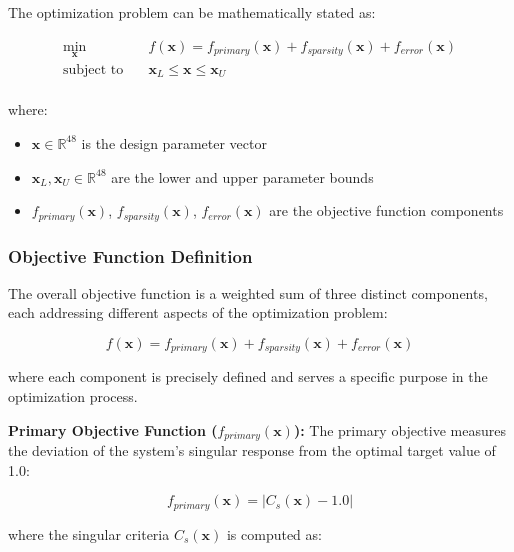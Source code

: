 \documentclass[12pt,a4paper]{article}
\begin{document}
The optimization problem can be mathematically stated as:

\begin{equation}\label{Eq.optimization_problem}
\begin{aligned}
\min_{\mathbf{x}} \quad & f(\mathbf{x}) = f_{primary}(\mathbf{x}) + f_{sparsity}(\mathbf{x}) + f_{error}(\mathbf{x}) \\
\text{subject to} \quad & \mathbf{x}_L \leq \mathbf{x} \leq \mathbf{x}_U \\
\end{aligned}
\end{equation}

where:
\begin{itemize}
    \item $\mathbf{x} \in \mathbb{R}^{48}$ is the design parameter vector
    \item $\mathbf{x}_L, \mathbf{x}_U \in \mathbb{R}^{48}$ are the lower and upper parameter bounds
    \item $f_{primary}(\mathbf{x})$, $f_{sparsity}(\mathbf{x})$, $f_{error}(\mathbf{x})$ are the objective function components
\end{itemize}

\subsubsection{Objective Function Definition}

The overall objective function is a weighted sum of three distinct components, each addressing different aspects of the optimization problem:

\begin{equation}\label{Eq.objective_function_detailed}
f(\mathbf{x}) = f_{primary}(\mathbf{x}) + f_{sparsity}(\mathbf{x}) + f_{error}(\mathbf{x})
\end{equation}

where each component is precisely defined and serves a specific purpose in the optimization process.

\textbf{Primary Objective Function ($f_{primary}(\mathbf{x})$):} The primary objective measures the deviation of the system's singular response from the optimal target value of 1.0:

\begin{equation}\label{Eq.primary_objective_detailed}
f_{primary}(\mathbf{x}) = \left| C_s(\mathbf{x}) - 1.0 \right|
\end{equation}

where the singular criteria $C_s(\mathbf{x})$ is computed as:
\end{document}

